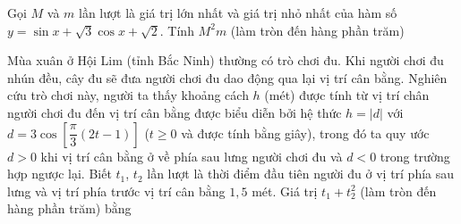 \begin{ex}
	Gọi $M$ và $m$ lần lượt là giá trị lớn nhất và giá trị nhỏ nhất của hàm số $y=\sin x+\sqrt{3}\cos x+\sqrt{2}$. Tính $M^2m$ (làm tròn đến hàng phần trăm)
\end{ex}
\begin{ex}
	Mùa xuân ở Hội Lim (tỉnh Bắc Ninh) thường có trò chơi đu. Khi người chơi đu nhún đều, cây đu sẽ đưa người chơi đu dao động qua lại vị trí cân bằng. Nghiên cứu trò chơi này, người ta thấy khoảng cách $h$ (mét) được tính từ vị trí chân người chơi đu đến vị trí cân bằng được biểu diễn bởi hệ thức $h=|d|$ với $d=3\cos \left[\dfrac{\pi }{3}(2t-1)\right]$ ($t\ge 0$ và được tính bằng giây), trong đó ta quy ước $d>0$ khi vị trí cân bằng ở về phía sau lưng người chơi đu và $d<0$ trong trường hợp ngược lại.
	Biết $t_1$, $t_2$ lần lượt là thời điểm đầu tiên người đu ở vị trí phía sau lưng và vị trí phía trước vị trí cân bằng $1{,}5$ mét. Giá trị $t_1+t_2^2$ (làm tròn đến hàng phần trăm) bằng
\end{ex}


